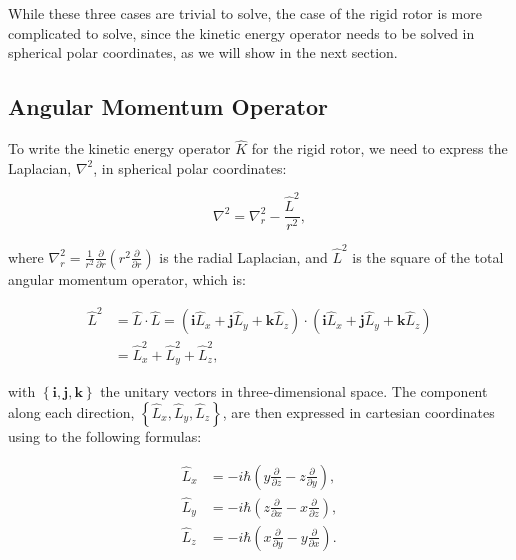 \documentclass[
  9pt,
]{extbook}
\theoremstyle{definition}
\theoremstyle{definition}
\theoremstyle{definition}
\theoremstyle{remark}
\begin{document}
While these three cases are trivial to solve, the case of the rigid rotor is more complicated to solve, since the kinetic energy operator needs to be solved in spherical polar coordinates, as we will show in the next section.

\hypertarget{angular-momentum-operator}{%
\subsection{Angular Momentum Operator}\label{angular-momentum-operator}}

To write the kinetic energy operator \(\hat{K}\) for the rigid rotor, we need to express the Laplacian, \(\nabla^2\), in spherical polar coordinates:

\begin{equation}
\nabla^2=\nabla^2_r - \frac{\hat{L}^2}{r^2},
\label{eq:angmom1}  
\end{equation}

where \(\nabla_r^2 = \frac{1}{r^2}\frac{\partial}{\partial r} \left( r^2\frac{\partial}{\partial r} \right)\) is the radial Laplacian, and \(\hat{L}^2\) is the square of the total angular momentum operator, which is:

\begin{equation}
\begin{aligned}
\hat{L}^2 &=\hat{L}\cdot\hat{L}=\left(\mathbf{i}\hat{L}_x+\mathbf{j}\hat{L}_y+\mathbf{k}\hat{L}_z\right)\cdot\left(\mathbf{i}\hat{L}_x+\mathbf{j}\hat{L}_y+\mathbf{k}\hat{L}_z \right) \\
&=\hat{L}_x^2+\hat{L}_y^2+\hat{L}_z^2,
\end{aligned}
\label{eq:angmom1b}    
\end{equation}

with \(\left\{\mathbf{i},\mathbf{j},\mathbf{k}\right\}\) the unitary vectors in three-dimensional space. The component along each direction, \(\left\{\hat{L}_x,\hat{L}_y,\hat{L}_z\right\}\), are then expressed in cartesian coordinates using to the following formulas:

\begin{equation}
\begin{aligned}
\hat{L}_x &= -i\hbar\left(y\frac{\partial}{\partial z} - z \frac{\partial}{\partial y} \right), \\
\hat{L}_y &= -i \hbar \left(z\frac{\partial}{\partial x} - x \frac{\partial}{\partial z} \right), \\
\hat{L}_z &= -i \hbar \left(x\frac{\partial}{\partial y} - y \frac{\partial}{\partial x} \right).
\end{aligned}
\label{eq:angmom2}    
\end{equation}
\end{document}

